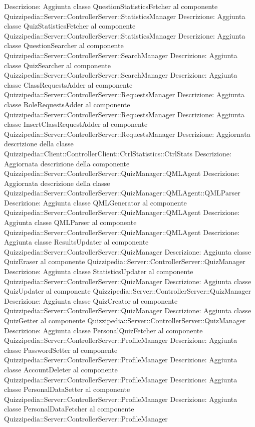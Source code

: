 Descrizione: Aggiunta classe QuestionStatisticsFetcher al componente Quizzipedia::Server::ControllerServer::StatisticsManager 
Descrizione: Aggiunta classe QuizStatisticsFetcher al componente Quizzipedia::Server::ControllerServer::StatisticsManager 
Descrizione: Aggiunta classe QuestionSearcher al componente Quizzipedia::Server::ControllerServer::SearchManager 
Descrizione: Aggiunta classe QuizSearcher al componente Quizzipedia::Server::ControllerServer::SearchManager 
Descrizione: Aggiunta classe ClassRequestsAdder al componente Quizzipedia::Server::ControllerServer::RequestsManager 
Descrizione: Aggiunta classe RoleRequestsAdder al componente Quizzipedia::Server::ControllerServer::RequestsManager 
Descrizione: Aggiunta classe InsertClassRequestAdder al componente Quizzipedia::Server::ControllerServer::RequestsManager 
Descrizione: Aggiornata descrizione della classe Quizzipedia::Client::ControllerClient::CtrlStatistics::CtrlStats 
Descrizione: Aggiornata descrizione della componente Quizzipedia::Server::ControllerServer::QuizManager::QMLAgent 
Descrizione: Aggiornata descrizione della classe Quizzipedia::Server::ControllerServer::QuizManager::QMLAgent::QMLParser 
Descrizione: Aggiunta classe QMLGenerator al componente Quizzipedia::Server::ControllerServer::QuizManager::QMLAgent 
Descrizione: Aggiunta classe QMLParser al componente Quizzipedia::Server::ControllerServer::QuizManager::QMLAgent 
Descrizione: Aggiunta classe ResultsUpdater al componente Quizzipedia::Server::ControllerServer::QuizManager 
Descrizione: Aggiunta classe QuizEraser al componente Quizzipedia::Server::ControllerServer::QuizManager 
Descrizione: Aggiunta classe StatisticsUpdater al componente Quizzipedia::Server::ControllerServer::QuizManager 
Descrizione: Aggiunta classe QuizUpdater al componente Quizzipedia::Server::ControllerServer::QuizManager 
Descrizione: Aggiunta classe QuizCreator al componente Quizzipedia::Server::ControllerServer::QuizManager 
Descrizione: Aggiunta classe QuizGetter al componente Quizzipedia::Server::ControllerServer::QuizManager 
Descrizione: Aggiunta classe PersonalQuizFetcher al componente Quizzipedia::Server::ControllerServer::ProfileManager 
Descrizione: Aggiunta classe PasswordSetter al componente Quizzipedia::Server::ControllerServer::ProfileManager 
Descrizione: Aggiunta classe AccountDeleter al componente Quizzipedia::Server::ControllerServer::ProfileManager 
Descrizione: Aggiunta classe PersonalDataSetter al componente Quizzipedia::Server::ControllerServer::ProfileManager 
Descrizione: Aggiunta classe PersonalDataFetcher al componente Quizzipedia::Server::ControllerServer::ProfileManager 
